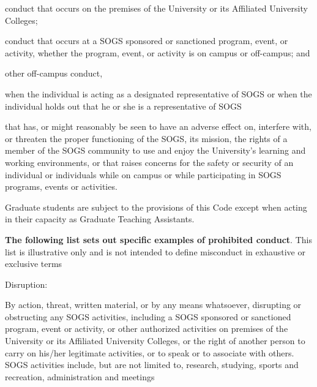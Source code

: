 \begin{longenum}[ label*=\arabic*., align=left]
\begin{longenum}[ label*=\arabic*., align=left]
                \begin{longenum}[ label*=\arabic*., align=left]
                \item conduct  that  occurs  on  the  premises  of  the  University  or  its  Affiliated  University Colleges; 
                \item conduct that occurs at a SOGS sponsored or sanctioned program, event, or activity, whether the program, event, or activity is on campus or off-campus; and
                \item other off-campus conduct,
                  \begin{longenum}[ label*=\arabic*., align=left]
                       \item when the individual is acting as a designated representative of SOGS or when the individual holds out that he or she is a representative of SOGS 
                       \item that has, or might reasonably be seen to have an adverse effect on, interfere with, or threaten the proper functioning of the SOGS, its mission, the rights of a member of the SOGS community to use and enjoy the University’s learning and working  environments,  or  that  raises  concerns  for  the  safety  or  security  of  an individual   or   individuals   while   on   campus   or  while   participating   in   SOGS programs, events or activities.
                  \end{longenum}
                \end{longenum}
\item Graduate  students  are  subject  to  the  provisions  of  this  Code  except  when  acting  in  their capacity as Graduate Teaching Assistants.
     \end{longenum}
\item \textbf{The following list sets out specific examples of prohibited conduct}. This list is illustrative only and is not intended to define misconduct in exhaustive or exclusive terms

 \begin{longenum}[ label*=\arabic*., align=left]
                       \item Disruption:
                       
                       By  action,  threat,  written  material,  or  by  any  means  whatsoever,  disrupting  or  obstructing any SOGS activities, including a SOGS sponsored or sanctioned program, event or activity, or other authorized activities on premises of the University or its Affiliated University Colleges, or the right of another person to carry on his/her legitimate activities, or to speak or to associate with others. SOGS  activities  include,  but  are  not  limited  to,  research,  studying,  sports  and  recreation, administration and meetings
                

\end{longenum}
\end{longenum}
